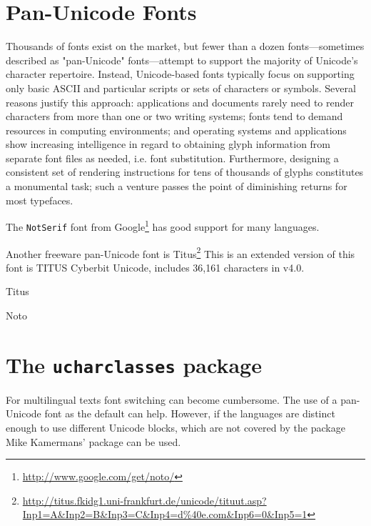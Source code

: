 \section{Pan-Unicode Fonts}

Thousands of fonts exist on the market, but fewer than a dozen fonts—sometimes described as "pan-Unicode" fonts—attempt to support the majority of Unicode's character repertoire. Instead, Unicode-based fonts typically focus on supporting only basic ASCII and particular scripts or sets of characters or symbols. Several reasons justify this approach: applications and documents rarely need to render characters from more than one or two writing systems; fonts tend to demand resources in computing environments; and operating systems and applications show increasing intelligence in regard to obtaining glyph information from separate font files as needed, i.e. font substitution. Furthermore, designing a consistent set of rendering instructions for tens of thousands of glyphs constitutes a monumental task; such a venture passes the point of diminishing returns for most typefaces.

The \texttt{NotSerif} font from Google\footnote{\protect\url{http://www.google.com/get/noto/}} has good support for many languages.

Another freeware pan-Unicode font is Titus\footnote{\protect\url{http://titus.fkidg1.uni-frankfurt.de/unicode/tituut.asp?Inp1=A&Inp2=B&Inp3=C&Inp4=d%40e.com&Inp6=0&Inp5=1}}
This is an extended version of this font is TITUS Cyberbit Unicode, includes 36,161 characters in v4.0.

\newfontfamily{}
\newfontfamily{}

\begin{scriptexample}[]{Titus}
\titus

\lorem
\end{scriptexample}
\bigskip

\begin{scriptexample}[]{Noto}
\noto

\lorem
\end{scriptexample}


\section{The \texttt{ucharclasses} package}

For multilingual texts font switching can become cumbersome. The use of a pan-Unicode font as the default can help. However, if the languages are distinct enough to use different Unicode blocks, which are not covered by the  package Mike Kamermans' package  can be used.

